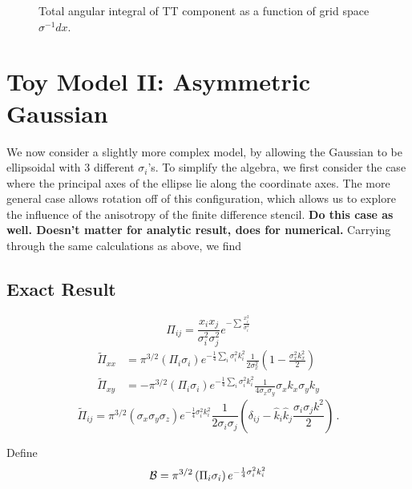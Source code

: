\documentclass{revtex4}
\begin{document}
\begin{figure}
  \caption{Total angular integral of TT component as a function of grid space $\sigma^{-1}dx$.}
\end{figure}


\section{Toy Model II: Asymmetric Gaussian}
We now consider a slightly more complex model, by allowing the Gaussian to be ellipsoidal with 3 different $\sigma_i$'s.
To simplify the algebra, we first consider the case where the principal axes of the ellipse lie along the coordinate axes.
The more general case allows rotation off of this configuration, which allows us to explore the influence of the anisotropy of the finite difference stencil.
{\bf Do this case as well.  Doesn't matter for analytic result, does for numerical.}
Carrying through the same calculations as above, we find

\subsection{Exact Result}
\begin{equation}
  \Pi_{ij} = \frac{x_ix_j}{\sigma_i^2\sigma_j^2}e^{-\sum\frac{x_i^2}{\sigma_i^2}}
\end{equation}
\begin{align}
  \tilde{\Pi}_{xx} &= \pi^{3/2}\left(\Pi_i\sigma_i\right)e^{-\frac{1}{4}\sum_i\sigma_i^2k_i^2}\frac{1}{2\sigma_x^2}\left(1-\frac{\sigma_x^2k_x^2}{2}\right) \\
  \tilde{\Pi}_{xy} &= -\pi^{3/2}\left(\Pi_i\sigma_i\right)e^{-\frac{1}{4}\sum_i\sigma_i^2k_i^2}\frac{1}{4\sigma_x\sigma_y}\sigma_xk_x\sigma_yk_y
\end{align}
\begin{equation}
  \tilde{\Pi}_{ij} = \pi^{3/2}(\sigma_x\sigma_y\sigma_z)e^{-\frac{1}{4}\sigma_i^2k_i^2}\frac{1}{2\sigma_i\sigma_j}\left(\delta_{ij} - \hat{k}_i\hat{k}_j\frac{\sigma_i\sigma_jk^2}{2}\right) \, .
\end{equation}

Define
\begin{equation}
  \mathcal{B} = \pi^{3/2}\left(\Pi_i\sigma_i\right)e^{-\frac{1}{4}\sigma_i^2k_i^2}
\end{equation}
\end{document}

